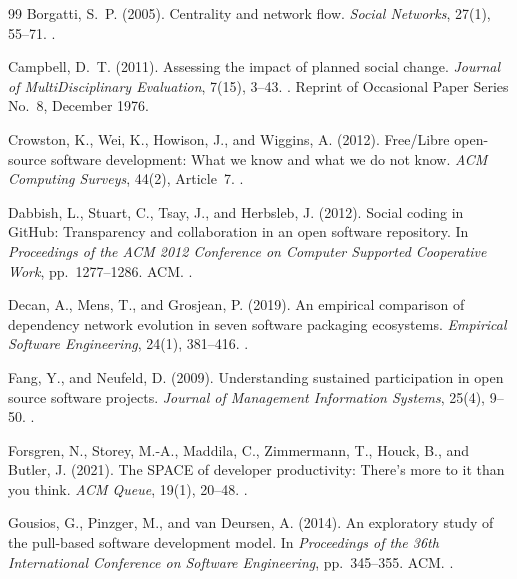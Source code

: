 \begin{thebibliography}{99}
\label{refs:chapter01}
Borgatti, S.~P. (2005).
Centrality and network flow.
\emph{Social Networks}, 27(1), 55--71.
.

Campbell, D.~T. (2011).
Assessing the impact of planned social change.
\emph{Journal of MultiDisciplinary Evaluation}, 7(15), 3--43.
.
Reprint of Occasional Paper Series No.~8, December 1976.

Crowston, K., Wei, K., Howison, J., and Wiggins, A. (2012).
Free/Libre open-source software development: What we know and what we do not know.
\emph{ACM Computing Surveys}, 44(2), Article~7.
.

Dabbish, L., Stuart, C., Tsay, J., and Herbsleb, J. (2012).
Social coding in GitHub: Transparency and collaboration in an open software repository.
In \emph{Proceedings of the ACM 2012 Conference on Computer Supported Cooperative Work}, pp.~1277--1286. ACM.
.

Decan, A., Mens, T., and Grosjean, P. (2019).
An empirical comparison of dependency network evolution in seven software packaging ecosystems.
\emph{Empirical Software Engineering}, 24(1), 381--416.
.

Fang, Y., and Neufeld, D. (2009).
Understanding sustained participation in open source software projects.
\emph{Journal of Management Information Systems}, 25(4), 9--50.
.

Forsgren, N., Storey, M.-A., Maddila, C., Zimmermann, T., Houck, B., and Butler, J. (2021).
The SPACE of developer productivity: There's more to it than you think.
\emph{ACM Queue}, 19(1), 20--48.
.

Gousios, G., Pinzger, M., and van Deursen, A. (2014).
An exploratory study of the pull-based software development model.
In \emph{Proceedings of the 36th International Conference on Software Engineering}, pp.~345--355. ACM.
.


\end{thebibliography}
